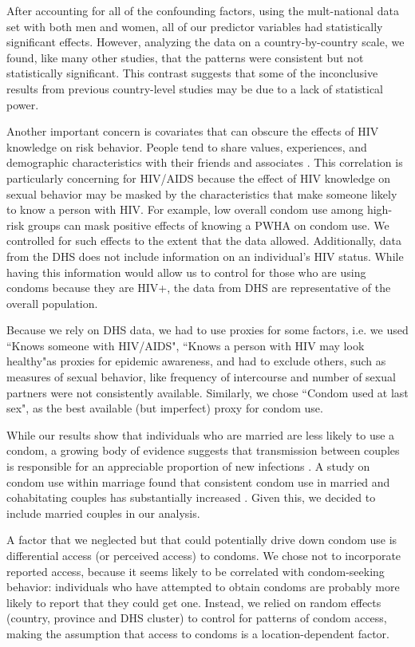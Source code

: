 \documentclass[10pt,letterpaper]{article}
\newcommand{\KnowsPWHA}{``Knows someone with HIV/AIDS"}
\newcommand{\KnowsHealthy}{``Knows a person with HIV may look healthy"}
\begin{document}
After accounting for all of the confounding factors, using the mult-national data set with both men and women, all of our predictor variables had statistically significant effects. However, analyzing the data on a country-by-country scale, we found, like many other studies, \cite{KayiFors11, CamlChim03, Zell03, Katz06} that the patterns were consistent but not statistically significant.  This contrast suggests that some of the inconclusive results from previous country-level studies \cite{KayiFors11, CamlChim03, PalePett08} may be due to a lack of statistical power.

Another important concern is covariates that can obscure the effects of HIV knowledge on risk behavior. People tend to share values, experiences, and demographic characteristics with their friends and associates \cite{CharBarg99}. This correlation is particularly concerning for HIV/AIDS because the effect of HIV knowledge on sexual behavior may be masked by the characteristics that make someone likely to know a person with HIV. For example, low overall condom use among high-risk groups can mask positive effects of knowing a PWHA on condom use.  We controlled for such effects to the extent that the data allowed. Additionally, data from the DHS does not include information on an individual's HIV status. While having this information would allow us to control for those who are using condoms because they are HIV+, the data from DHS are representative of the overall population. 

Because we rely on DHS data, we had to use proxies for some factors, i.e. we used \KnowsPWHA, \KnowsHealthy as proxies for epidemic awareness, and had to exclude others, such as measures of sexual behavior, like frequency of intercourse and number of sexual partners were not consistently available. Similarly, we chose ``Condom used at last sex", as the best available (but imperfect) proxy for condom use. 

While our results show that individuals who are married are less likely to use a condom, a growing body of evidence suggests that transmission between couples is responsible for an appreciable proportion of new infections \cite{Maharaj_2012, Chemaitelly_2012}. A study on condom use within marriage found that consistent condom use in married and cohabitating couples has substantially increased \cite{Maharaj_2012}. Given this, we decided to include married couples in our analysis. 

A factor that we neglected but that could potentially drive down condom use is differential access (or perceived access) to condoms.  We chose not to incorporate reported access, because it seems likely to be correlated with condom-seeking behavior: individuals who have attempted to obtain condoms are probably more likely to report that they could get one.  Instead, we relied on random effects (country, province and DHS cluster) to control for patterns of condom access, making the assumption that access to condoms is a location-dependent factor.
\end{document}
